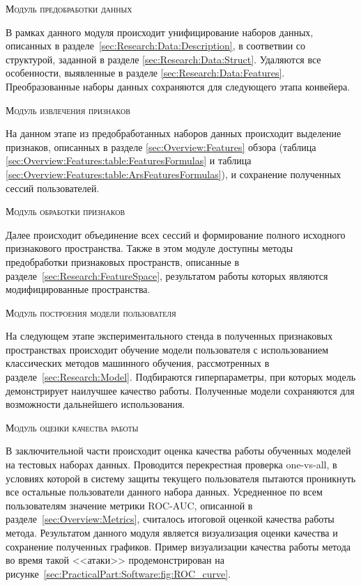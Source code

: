 \documentclass[12pt]{article}
\begin{document}
    \par \textsc{Модуль предобработки данных}
    \par В рамках данного модуля происходит унифицирование наборов данных, описанных в разделе~\ref{sec:Research:Data:Description}, в соответвии со структурой, заданной в разделе \ref{sec:Research:Data:Struct}. Удаляются все особенности, выявленные в разделе \ref{sec:Research:Data:Features}. Преобразованные наборы данных сохраняются для следующего этапа конвейера. \\

    \par \textsc{Модуль извлечения признаков}
    \par На данном этапе из предобработанных наборов данных происходит выделение признаков, описанных в разделе \ref{sec:Overview:Features} обзора (таблица \ref{sec:Overview:Features:table:FeaturesFormulas} и таблица \ref{sec:Overview:Features:table:ArsFeaturesFormulas}), и сохранение полученных сессий пользователей. \\

    \par \textsc{Модуль обработки признаков}
    \par Далее происходит объединение всех сессий и формирование полного исходного признакового пространства. Также в этом модуле доступны методы предобработки признаковых пространств, описанные в разделе~\ref{sec:Research:FeatureSpace}, результатом работы которых являются модифицированные пространства. \\

    \par \textsc{Модуль построения модели пользователя}
    \par На следующем этапе экспериментального стенда в полученных признаковых пространствах происходит обучение модели пользователя с использованием классических методов машинного обучения, рассмотренных в разделе~\ref{sec:Research:Model}. Подбираются гиперпараметры, при которых модель демонстрирует наилучшее качество работы. Полученные модели сохраняются для возможности дальнейшего использования. \\

    \par \textsc{Модуль оценки качества работы}
    \par В заключительной части происходит оценка качества работы обученных моделей на тестовых наборах данных. Проводится перекрестная проверка one-vs-all, в условиях которой в систему защиты текущего пользователя пытаются проникнуть все остальные пользователи данного набора данных. Усредненное по всем пользователям значение метрики ROC-AUC, описанной в разделе~\ref{sec:Overview:Metrics}, считалось итоговой оценкой качества работы метода. Результатом данного модуля является визуализация оценки качества и сохранение полученных графиков. Пример визуализации качества работы метода во время такой <<атаки>> продемонстрирован на рисунке~\ref{sec:PracticalPart:Software:fig:ROC_curve}. \\
\end{document}
